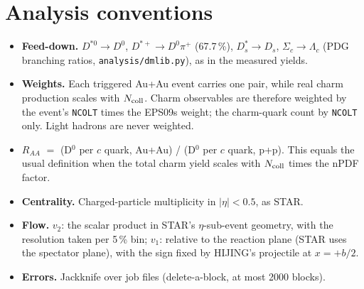 \documentclass[11pt,a4paper]{article}
\newcommand{\code}[1]{\texttt{#1}}
\begin{document}
\section{Analysis conventions}\label{sec:analysis}
\begin{itemize}
\item \textbf{Feed-down.} $D^{*0}\to D^0$, $D^{*+}\to D^0\pi^+$ (67.7\,\%), $D_s^*\to D_s$, $\Sigma_c\to\Lambda_c$
  (PDG branching ratios, \code{analysis/dmlib.py}), as in the measured yields.
\item \textbf{Weights.} Each triggered Au+Au event carries one pair, while real charm production scales with
  $N_{\rm coll}$. Charm observables are therefore weighted by the event's \code{NCOLT} times the EPS09s weight; the
  charm-quark count by \code{NCOLT} only. Light hadrons are never weighted.
\item \textbf{$R_{AA}$} $=$ (D$^0$ per $c$ quark, Au+Au) / (D$^0$ per $c$ quark, p+p). This equals the usual definition
  when the total charm yield scales with $N_{\rm coll}$ times the nPDF factor.
\item \textbf{Centrality.} Charged-particle multiplicity in $|\eta|<0.5$, as STAR.
\item \textbf{Flow.} $v_2$: the scalar product in STAR's $\eta$-sub-event geometry, with the resolution taken per 5\,\%
  bin; $v_1$: relative to the reaction plane (STAR uses the spectator plane), with the sign fixed by HIJING's projectile
  at $x=+b/2$.
\item \textbf{Errors.} Jackknife over job files (delete-a-block, at most 2000 blocks).
\end{itemize}
\end{document}
